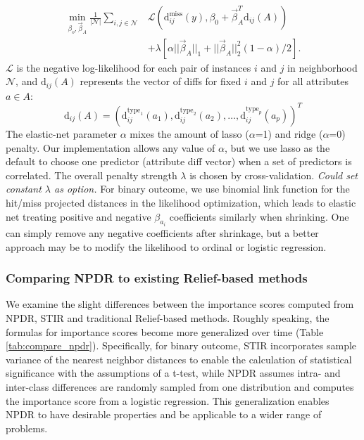 \documentclass[10pt]{article}
\begin{document}
\begin{equation}\label{eq:glmnetNPDR}
\begin{aligned}
    \min_{\beta_o, \vec{\beta}_A} \frac{1}{|\mathcal{N}|}  \sum_{i,j \in \mathcal{N}} & 
           \mathcal{L} \left(\text{d}^{\text{miss}}_{ij}(y), \beta_0 + \vec{\beta}_A^{T} \text{d}_{ij}(A) \right)
     \\ \nonumber
     & + \lambda \left[ \alpha || \vec{\beta}_A ||_1 + || \vec{\beta}_A ||_2^2 (1-\alpha)/2  \right].
\end{aligned}
\end{equation}
$\mathcal{L}$ is the negative log-likelihood for each pair of instances $i$ and $j$ in neighborhood $\mathcal{N}$, and $\text{d}_{ij}(A)$ represents the vector of diffs for fixed $i$ and $j$ for all attributes $a \in A$: 
\begin{equation}
\text{d}_{ij}(A)= \left( \text{d}^{\text{type}_1}_{ij}(a_1), \text{d}^{\text{type}_2}_{ij}(a_2), \ldots, \text{d}^{\text{type}_p}_{ij}(a_p) \right)^{T}
\end{equation}
The elastic-net parameter $\alpha$ mixes the amount of lasso ($\alpha$=1) and ridge ($\alpha$=0) penalty. Our implementation allows any value of $\alpha$, but we use lasso as the default to choose one predictor (attribute diff vector) when a set of predictors is correlated. The overall penalty strength $\lambda$ is chosen by cross-validation.  {\it Could set constant $\lambda$ as option.} For binary outcome, we use binomial link function for the hit/miss projected distances in the likelihood optimization, which leads to elastic net treating positive and negative $\beta_{a_i}$ coefficients similarly when shrinking. One can simply remove any negative coefficients after shrinkage, but a better approach may be to modify the likelihood to ordinal or logistic regression.   

\subsubsection{Comparing NPDR to existing Relief-based methods}
We examine the slight differences between the importance scores computed from NPDR, STIR and traditional Relief-based methods.
Roughly speaking, the formulas for importance scores become more generalized over time (Table \ref{tab:compare_npdr}).
Specifically, for binary outcome, STIR incorporates sample variance of the nearest neighbor distances to enable the calculation of statistical significance with the assumptions of a t-test, while NPDR assumes intra- and inter-class differences are randomly sampled from one distribution and computes the importance score from a logistic regression.
This generalization enables NPDR to have desirable properties and be applicable to a wider range of problems.
\end{document}
